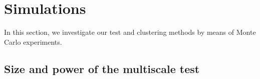 \documentclass[12pt]{article}
\begin{document}
\def\spacingset#1{\renewcommand{\baselinestretch}%
{#1}\small\normalsize} \spacingset{1}



\spacingset{1.8} %

\def\thesection{\Alph{section}}

\allowdisplaybreaks[4]

\setlength{\abovedisplayskip}{3pt}
\setlength{\belowdisplayskip}{3pt}



\section{Simulations}\label{sec:sim}


In this section, we investigate our test and clustering methods by means of Monte Carlo experiments.


\subsection{Size and power of the multiscale test}\label{subsec:sim:main} 
\end{document}
